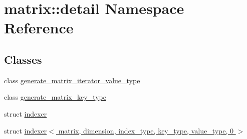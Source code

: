 \hypertarget{namespacematrix_1_1detail}{}\section{matrix\+:\+:detail Namespace Reference}
\label{namespacematrix_1_1detail}
\subsection*{Classes}
\begin{DoxyCompactItemize}
\item 
class \hyperlink{classmatrix_1_1detail_1_1generate__matrix__iterator__value__type}{generate\+\_\+matrix\+\_\+iterator\+\_\+value\+\_\+type}
\item 
class \hyperlink{classmatrix_1_1detail_1_1generate__matrix__key__type}{generate\+\_\+matrix\+\_\+key\+\_\+type}
\item 
struct \hyperlink{structmatrix_1_1detail_1_1indexer}{indexer}
\item 
struct \hyperlink{structmatrix_1_1detail_1_1indexer_3_01matrix_00_01dimension_00_01index__type_00_01key__type_00_01value__type_00_010_01_4}{indexer$<$ matrix, dimension, index\+\_\+type, key\+\_\+type, value\+\_\+type, 0 $>$}
\end{DoxyCompactItemize}
